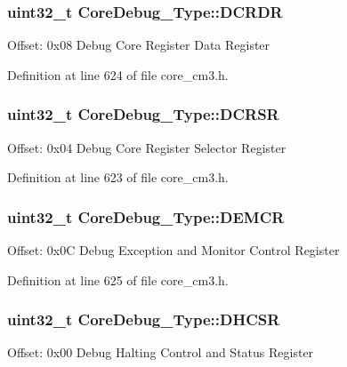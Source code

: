 \subsubsection[{\texorpdfstring{D\+C\+R\+DR}{DCRDR}}]{ {\bf uint32\+\_\+t} Core\+Debug\+\_\+\+Type\+::\+D\+C\+R\+DR}\hypertarget{struct_core_debug___type_ab8f4bb076402b61f7be6308075a789c9}{}\label{struct_core_debug___type_ab8f4bb076402b61f7be6308075a789c9}
Offset\+: 0x08 Debug Core Register Data Register 

Definition at line 624 of file core\+\_\+cm3.\+h.

\subsubsection[{\texorpdfstring{D\+C\+R\+SR}{DCRSR}}]{ {\bf uint32\+\_\+t} Core\+Debug\+\_\+\+Type\+::\+D\+C\+R\+SR}\hypertarget{struct_core_debug___type_afefa84bce7497652353a1b76d405d983}{}\label{struct_core_debug___type_afefa84bce7497652353a1b76d405d983}
Offset\+: 0x04 Debug Core Register Selector Register 

Definition at line 623 of file core\+\_\+cm3.\+h.

\subsubsection[{\texorpdfstring{D\+E\+M\+CR}{DEMCR}}]{ {\bf uint32\+\_\+t} Core\+Debug\+\_\+\+Type\+::\+D\+E\+M\+CR}\hypertarget{struct_core_debug___type_a5cdd51dbe3ebb7041880714430edd52d}{}\label{struct_core_debug___type_a5cdd51dbe3ebb7041880714430edd52d}
Offset\+: 0x0C Debug Exception and Monitor Control Register 

Definition at line 625 of file core\+\_\+cm3.\+h.

\subsubsection[{\texorpdfstring{D\+H\+C\+SR}{DHCSR}}]{ {\bf uint32\+\_\+t} Core\+Debug\+\_\+\+Type\+::\+D\+H\+C\+SR}\hypertarget{struct_core_debug___type_a25c14c022c73a725a1736e903431095d}{}\label{struct_core_debug___type_a25c14c022c73a725a1736e903431095d}
Offset\+: 0x00 Debug Halting Control and Status Register 

